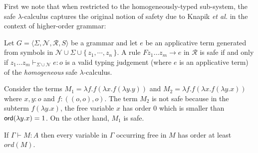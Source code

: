 \documentclass{llncs}
\newcommand\rulef[2]{\frac{\dps #1}{\dps #2}}
\newcommand{\makeset}[1]{\{\,{#1}\,\}}
\begin{document}
First we note that when restricted to the homogeneously-typed
sub-system, the safe $\lambda$-calculus captures the original notion
of safety due to Knapik \emph{et al.} in the context of higher-order
grammar:

\begin{proposition} Let $G = \langle \Sigma, \mathcal{N}, \mathcal{R},
  S \rangle$ be a grammar and let $e$ be an applicative term generated
  from symbols in $\mathcal{N} \cup \Sigma \cup \makeset{z_1, \cdots,
    z_n}$.  A rule $F z_1 \ldots z_m \rightarrow e$ in $\mathcal{R}$
  is safe if and only if $ z_1 \ldots z_m \vdash_{\Sigma \cup
    \mathcal{N}} e : o$ is a valid typing judgement (where $e$ is an
  applicative term) of the \emph{homogeneous} safe $\lambda$-calculus.
\end{proposition}

\begin{example}
\label{ex:kierstead}
Consider the terms $M_1 = \lambda f . f (\lambda x . f (\lambda y . y
))$ and $M_2 = \lambda f . f (\lambda x . f (\lambda y .x ))$ where
$x,y:o$ and $f:((o,o),o)$. The term $M_2$ is not safe because in the
subterm $f (\lambda y . x)$, the free variable $x$ has order $0$ which
is smaller than ${\sf ord}(\lambda y . x) = 1$.  On the other hand, $M_1$
is safe.
\end{example}

\begin{lemma}
\label{lem:ordfreevar}
If $\Gamma \vdash M : A$ then every variable in $\Gamma$ occurring
free in $M$ has order at least $ord(M)$.
\end{lemma}
\end{document}
